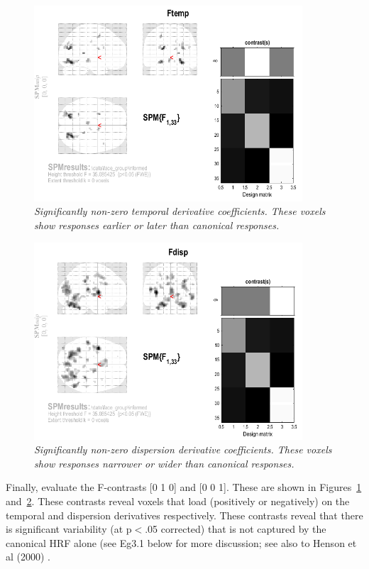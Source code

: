 \begin{figure}
\begin{center}
\includegraphics[width=100mm]{faces_group/Ftemp}
\caption{\em Significantly non-zero temporal derivative coefficients. These voxels show responses earlier or later than canonical responses. \label{informed_Ftemp}}
\end{center}
\end{figure}
\begin{figure}
\begin{center}
\includegraphics[width=100mm]{faces_group/Fdisp}
\caption{\em Significantly non-zero dispersion derivative coefficients. These voxels show responses narrower or wider than canonical responses. \label{informed_Fdisp}}
\end{center}
\end{figure}

	Finally, evaluate the F-contrasts [0 1 0] and [0 0 1]. These 
	are shown in Figures~\ref{informed_Ftemp} and~\ref{informed_Fdisp}.
These contrasts reveal voxels that load (positively or negatively) on the temporal and dispersion derivatives respectively. These contrasts reveal that there is significant variability (at p$<$.05 corrected) that is not captured by the canonical HRF alone (see Eg3.1 below for more discussion; see also to Henson et al (2000) \cite{rnah_basis}.

